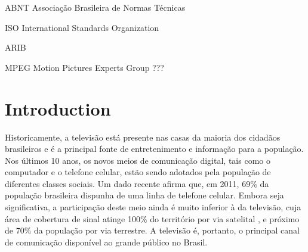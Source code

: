 \documentclass[
	12pt,				%
	openright,			%
	twoside,			%
	a4paper,			%
	brazil,
	french,				%
	english
	]{abntex2}
\begin{document}
\listoffigures*
\cleardoublepage


\begin{siglas}
  \item[ABNT] Associação Brasileira de Normas Técnicas
  \item[ISO] International Standards Organization
  \item[ARIB]
  \item[MPEG] Motion Pictures Experts Group ???
  \item[]
  \item[]
  \item[]
  \item[]
\end{siglas}


\tableofcontents*
\cleardoublepage



\textual

\chapter[Introduction]{Introduction}

Historicamente, a televisão está presente nas casas da maioria dos cidadãos brasileiros e é a principal fonte de
entretenimento e informação para a população. Nos últimos 10 anos, os novos meios de comunicação digital, tais
como o computador e o telefone celular, estão sendo adotados pela população de diferentes classes sociais. Um
dado recente \cite{pnad2011} afirma que, em 2011, 69\% da população brasileira dispunha de uma linha de 
telefone celular. Embora seja significativa, a participação deste meio ainda é muito inferior à da televisão,
cuja área de cobertura de sinal atinge 100\% do território por via satelital \cite{starone}, e próximo de
70\% da população por via terrestre. A televisão é, portanto, o principal canal de comunicação disponível ao 
grande público no Brasil.
\end{document}
